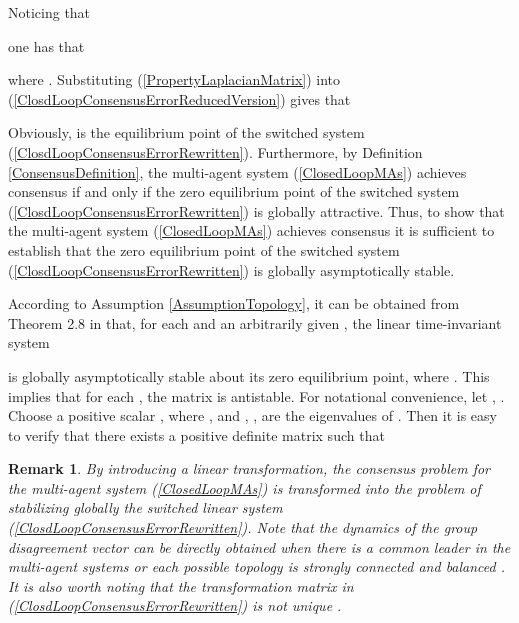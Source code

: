 \documentclass[letterpaper, 10 pt, conference]{ieeeconf}
\newtheorem{remark}{Remark}
\begin{document}
Noticing that

one has that

where . Substituting (\ref{PropertyLaplacianMatrix}) into
(\ref{ClosdLoopConsensusErrorReducedVersion}) gives that

Obviously,  is the equilibrium point of the switched system
(\ref{ClosdLoopConsensusErrorRewritten}). Furthermore, by Definition
\ref{ConsensusDefinition}, the multi-agent system (\ref{ClosedLoopMAs})
achieves consensus if and only if the zero equilibrium point of the switched
system (\ref{ClosdLoopConsensusErrorRewritten}) is globally
attractive. Thus,  to show that
the multi-agent system (\ref{ClosedLoopMAs}) achieves consensus it is
sufficient to establish that the zero
equilibrium point of the switched system
(\ref{ClosdLoopConsensusErrorRewritten}) is globally asymptotically
stable.

According to Assumption \ref{AssumptionTopology}, it can be
obtained from Theorem 2.8 in \cite{RenBeard2008Book} that, for each  and an arbitrarily given , the linear
time-invariant system

is globally asymptotically stable about its zero equilibrium point, where
. This implies that for each
, the  matrix
 is antistable. For notational convenience, let
,
. Choose a positive scalar
, where  , and
, , are the
eigenvalues of .
Then it is easy to verify that there
exists a positive definite matrix  such that

\par
\begin{remark}
By introducing a linear transformation, the
  consensus problem for the multi-agent system
(\ref{ClosedLoopMAs}) is transformed into the
problem of stabilizing globally
the switched linear system
(\ref{ClosdLoopConsensusErrorRewritten}). Note that the dynamics of the group
disagreement vector  can be directly obtained when there is a common leader
in the multi-agent systems or each possible topology is strongly connected
and balanced \cite{WenHuYuChenCaoSCL2013,WenYuCaoHuChenASCC2013}. It is
also worth noting that the
transformation matrix  in (\ref{ClosdLoopConsensusErrorRewritten}) is
not unique \cite{WenwuCaoLuSIAM2007,SunWangXieTAC2008}.
\end{remark}
\par
\end{document}
